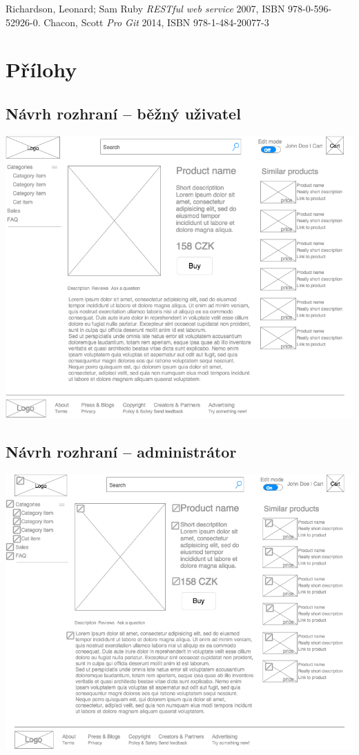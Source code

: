 \documentclass[11pt,a4paper]{article}
\begin{document}
\begin{thebibliography}{1}

   Richardson, Leonard; Sam Ruby {\em  RESTful web service} 2007, ISBN 978-0-596-52926-0.
   Chacon, Scott {\em Pro Git} 2014, ISBN 978-1-484-20077-3

\end{thebibliography}

\section*{Přílohy}

\subsection*{Návrh rozhraní -- běžný uživatel}
\includegraphics[scale=0.6]{pyngshop.png}
\subsection*{Návrh rozhraní -- administrátor}
\includegraphics[scale=0.6]{pyngshop_edit.png}
\newpage
\end{document}
